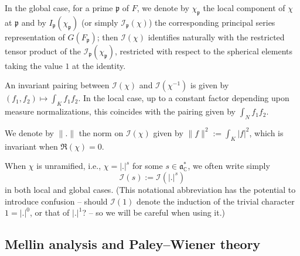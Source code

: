 \documentclass[reqno]{amsart}
\theoremstyle{plain} \newtheorem{theorem} {Theorem}
\theoremstyle{definition} \newtheorem{definition} [theorem] {Definition}
\theoremstyle{itplain} %
\numberwithin{equation}{section}
\numberwithin{theorem}{section}
\begin{document}
In the global case, for a prime $\mathfrak{p}$ of $F$, we denote by $\chi_\mathfrak{p}$ the local component of $\chi$ at $\mathfrak{p}$ and by $I_\mathfrak{p}(\chi_\mathfrak{p})$ (or simply $\mathcal{I}_\mathfrak{p}(\chi)$) the corresponding principal series representation of $G(F_\mathfrak{p})$; then $\mathcal{I}(\chi)$ identifies naturally with the restricted tensor product of the $\mathcal{I}_\mathfrak{p}(\chi_\mathfrak{p})$, restricted with respect to the spherical elements taking the value $1$ at the identity.


An invariant pairing between $\mathcal{I}(\chi)$ and $\mathcal{I}(\chi^{-1})$ is given by $(f_1,f_2) \mapsto \int_{K} f_1 f_2$.  In the local case, up to a constant factor depending upon measure normalizations, this coincides with the pairing given by $\int_N f_1 f_2$.

We denote by $\|.\|$ the norm on $\mathcal{I}(\chi)$ given by $\|f\|^2 := \int _{K} |f|^2$, which is invariant when $\Re(\chi) = 0$.

When $\chi$ is unramified, i.e., $\chi = |.|^s$ for some $s \in \mathfrak{a}_{\mathbb{C}}^*$, we often write simply 
\begin{equation*}
  \mathcal{I}(s) := \mathcal{I}(|.|^s)
\end{equation*}
in both local and global cases.  (This notational abbreviation has the potential to introduce confusion -- should $\mathcal{I}(1)$ denote the induction of the trivial character $1 = |.|^0$, or that of $|.|^1$? -- so we will be careful when using it.)



\subsection{Mellin analysis and Paley--Wiener theory}\label{sec:mell-analys-paley}
\end{document}
